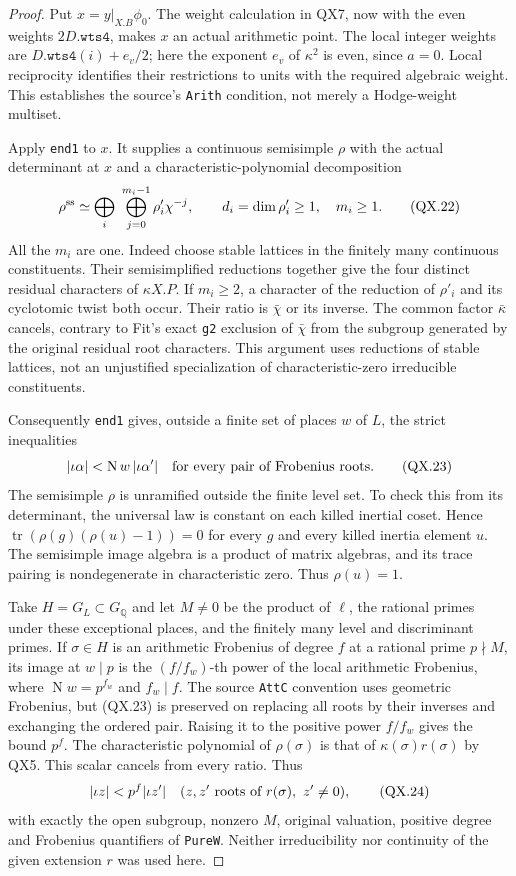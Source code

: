 \begin{proof}
Put $x=y|_{X.B}\phi_0$.  The weight calculation
in QX7, now with the even weights $2D.\texttt{wts4}$,
makes $x$ an actual arithmetic point.  The local
integer weights are
$D.\texttt{wts4}(i)+e_v/2$; here the exponent $e_v$
of $\kappa^2$ is even, since $a=0$.
Local reciprocity identifies their restrictions to
units with the required algebraic weight.  This
establishes the source's \texttt{Arith} condition,
not merely a Hodge-weight multiset.

Apply \texttt{end1} to $x$.  It supplies a continuous
semisimple $\rho$ with the actual determinant at $x$
and a characteristic-polynomial decomposition
\[
 \rho^{\rm ss}\simeq
 \bigoplus_i\ \bigoplus_{j=0}^{m_i-1}
                  \rho'_i\chi^{-j},
 \qquad d_i=\dim\rho'_i\ge1,\quad m_i\ge1.
 \tag{QX.22}
\]
All the $m_i$ are one.  Indeed choose stable lattices
in the finitely many continuous constituents.  Their
semisimplified reductions together give the four
distinct residual characters of $\kappa X.P$.
If $m_i\ge2$, a character of the reduction of
$\rho'_i$ and its cyclotomic twist both occur.
Their ratio is $\bar\chi$ or its inverse.
The common factor $\bar\kappa$ cancels, contrary
to Fit's exact \texttt{g2} exclusion of
$\bar\chi$ from the subgroup generated by the
original residual root characters.  This argument
uses reductions of stable lattices, not an
unjustified specialization of characteristic-zero
irreducible constituents.

Consequently \texttt{end1} gives, outside a finite
set of places $w$ of $L$, the strict inequalities
\[
        |\iota\alpha|<\operatorname{N}w\,
                           |\iota\alpha'|
        \quad\hbox{for every pair of Frobenius roots.}
        \tag{QX.23}
\]
The semisimple $\rho$ is unramified outside the
finite level set.  To check this from its determinant,
the universal law is constant on each killed
inertial coset.  Hence
$\operatorname{tr}(\rho(g)(\rho(u)-1))=0$ for
every $g$ and every killed inertia element $u$.
The semisimple image algebra is a product of matrix
algebras, and its trace pairing is nondegenerate in
characteristic zero.  Thus $\rho(u)=1$.

Take $H=G_L\subset G_{\mathbb Q}$ and let $M\ne0$
be the product of $\ell$, the rational primes under
these exceptional places, and the finitely many
level and discriminant primes.  If
$\sigma\in H$ is an arithmetic Frobenius of degree
$f$ at a rational prime $p\nmid M$, its image at
$w\mid p$ is the $(f/f_w)$-th power of the local
arithmetic Frobenius, where
$\operatorname{N}w=p^{f_w}$ and $f_w\mid f$.
The source \texttt{AttC} convention uses geometric
Frobenius, but (QX.23) is preserved on replacing
all roots by their inverses and exchanging the
ordered pair.  Raising it to the positive power
$f/f_w$ gives the bound $p^f$.
The characteristic polynomial of $\rho(\sigma)$
is that of $\kappa(\sigma)r(\sigma)$ by QX5.
This scalar cancels from every ratio.  Thus
\[
       |\iota z|<p^f|\iota z'|
       \quad(z,z'\hbox{ roots of }r(\sigma),\ z'\ne0),
       \tag{QX.24}
\]
with exactly the open subgroup, nonzero $M$, original
valuation, positive degree and Frobenius quantifiers
of \texttt{PureW}.  Neither irreducibility nor
continuity of the given extension $r$ was used here.


\end{proof}
